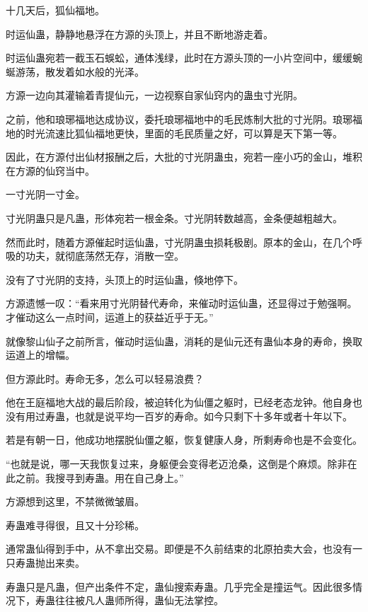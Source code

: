 
\begin{this_body}



十几天后，狐仙福地。

时运仙蛊，静静地悬浮在方源的头顶上，并且不断地游走着。

时运仙蛊宛若一截玉石蜈蚣，通体浅绿，此时在方源头顶的一小片空间中，缓缓蜿蜒游荡，散发着如水般的光泽。

方源一边向其灌输着青提仙元，一边视察自家仙窍内的蛊虫寸光阴。

之前，他和琅琊福地达成协议，委托琅琊福地中的毛民炼制大批的寸光阴。琅琊福地的时光流速比狐仙福地更快，里面的毛民质量之好，可以算是天下第一等。

因此，在方源付出仙材报酬之后，大批的寸光阴蛊虫，宛若一座小巧的金山，堆积在方源的仙窍当中。

一寸光阴一寸金。

寸光阴蛊只是凡蛊，形体宛若一根金条。寸光阴转数越高，金条便越粗越大。

然而此时，随着方源催起时运仙蛊，寸光阴蛊虫损耗极剧。原本的金山，在几个呼吸的功夫，就彻底荡然无存，消散一空。

没有了寸光阴的支持，头顶上的时运仙蛊，倏地停下。

方源遗憾一叹：“看来用寸光阴替代寿命，来催动时运仙蛊，还显得过于勉强啊。才催动这么一点时间，运道上的获益近乎于无。”

就像黎山仙子之前所言，催动时运仙蛊，消耗的是仙元还有蛊仙本身的寿命，换取运道上的增幅。

但方源此时。寿命无多，怎么可以轻易浪费？

他在王庭福地大战的最后阶段，被迫转化为仙僵之躯时，已经老态龙钟。他自身也没有用过寿蛊，也就是说平均一百岁的寿命。如今只剩下十多年或者十年以下。

若是有朝一日，他成功地摆脱仙僵之躯，恢复健康人身，所剩寿命也是不会变化。

“也就是说，哪一天我恢复过来，身躯便会变得老迈沧桑，这倒是个麻烦。除非在此之前。我搜寻到寿蛊。用在自己身上。”

方源想到这里，不禁微微皱眉。

寿蛊难寻得很，且又十分珍稀。

通常蛊仙得到手中，从不拿出交易。即便是不久前结束的北原拍卖大会，也没有一只寿蛊抛出来卖。

寿蛊只是凡蛊，但产出条件不定，蛊仙搜索寿蛊。几乎完全是撞运气。因此很多情况下，寿蛊往往被凡人蛊师所得，蛊仙无法掌控。


\end{this_body}
